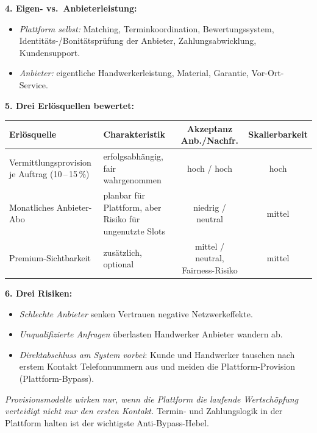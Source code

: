 \documentclass[11pt,a4paper,oneside]{article}
\begin{document}
\begin{loesungbox}
\textbf{4. Eigen- vs.\ Anbieterleistung:}
\begin{itemize}
  \item \emph{Plattform selbst:} Matching, Terminkoordination, Bewertungssystem, Identitäts-/Bonitätsprüfung der Anbieter, Zahlungsabwicklung, Kundensupport.
  \item \emph{Anbieter:} eigentliche Handwerkerleistung, Material, Garantie, Vor-Ort-Service.
\end{itemize}

\textbf{5. Drei Erlösquellen \textendash{} bewertet:}

\smallskip
\begin{tabularx}{\linewidth}{@{}lXcc@{}}
\toprule
\textbf{Erlösquelle} & \textbf{Charakteristik} & \textbf{Akzeptanz Anb./Nachfr.} & \textbf{Skalierbarkeit} \\
\midrule
Vermittlungsprovision je Auftrag (10\,--\,15\,\%) & erfolgsabhängig, fair wahrgenommen & hoch / hoch & hoch \\
\midrule
Monatliches Anbieter-Abo & planbar für Plattform, aber Risiko für ungenutzte Slots & niedrig / neutral & mittel \\
\midrule
Premium-Sichtbarkeit & zusätzlich, optional & mittel / neutral, Fairness-Risiko & mittel \\
\bottomrule
\end{tabularx}

\textbf{6. Drei Risiken:}
\begin{itemize}
  \item \emph{Schlechte Anbieter} senken Vertrauen \textendash{} negative Netzwerkeffekte.
  \item \emph{Unqualifizierte Anfragen} überlasten Handwerker \textendash{} Anbieter wandern ab.
  \item \emph{Direktabschluss am System vorbei}: Kunde und Handwerker tauschen nach erstem Kontakt Telefonnummern aus und meiden die Plattform-Provision (Plattform-Bypass).
\end{itemize}

\begin{merkbox}[Managementhinweis]
\emph{Provisionsmodelle wirken nur, wenn die Plattform die laufende Wertschöpfung verteidigt \textendash{} nicht nur den ersten Kontakt.} Termin- und Zahlungslogik in der Plattform halten ist der wichtigste Anti-Bypass-Hebel.
\end{merkbox}
\end{loesungbox}

\clearpage
\end{document}
